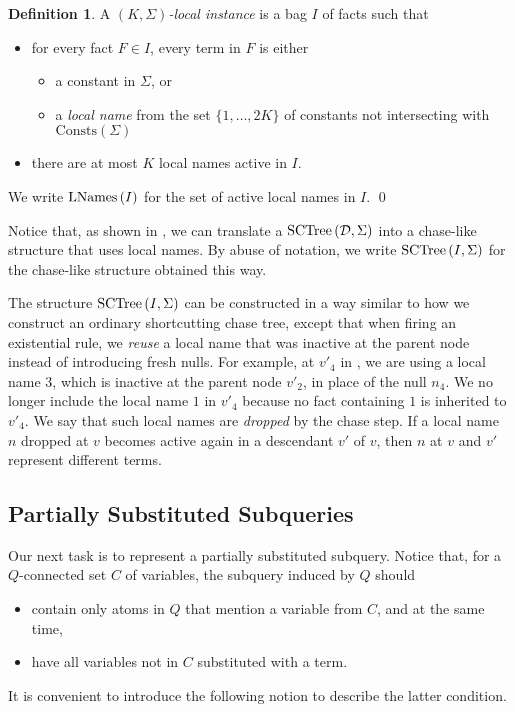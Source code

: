 \documentclass[12pt]{report}
\theoremstyle{plain}
\theoremstyle{definition}
\newtheorem{definition}[theorem]{Definition}
\def\Consts{{\mathrm{Consts}}}
\newcommand{\SCTree}[2]{\ensuremath{\normalfont{\textrm{SCTree}} \left( #1, #2 \right)}}
\newcommand{\LNames}[1]{\ensuremath{\normalfont{\textrm{LNames}} \left( #1 \right)}}
\begin{document}
\begin{definition}
  A \emph{$(K, \Sigma)$-local instance} is a bag $I$ of facts such that
  \begin{itemize}
    \item for every fact $F \in I$, every term in $F$ is either
    \begin{itemize}
      \item a constant in $\Sigma$, or
      \item a \emph{local name} from the set $\{ 1, \ldots, 2K \}$ of constants not intersecting with $\Consts(\Sigma)$
    \end{itemize}
    \item there are at most $K$ local names active in $I$.
  \end{itemize}

  We write $\LNames{I}$ for the set of active local names in $I$.
  \qed
\end{definition}

Notice that, as shown in , we can translate a $\SCTree{\mathcal{D}}{\Sigma}$ into a chase-like structure that uses local names. By abuse of notation, we write $\SCTree{I}{\Sigma}$ for the chase-like structure obtained this way.

The structure $\SCTree{I}{\Sigma}$ can be constructed in a way similar to how we construct an ordinary shortcutting chase tree, except that when firing an existential rule, we \emph{reuse} a local name that was inactive at the parent node instead of introducing fresh nulls. For example, at $v'_4$ in , we are using a local name $3$, which is inactive at the parent node $v'_2$, in place of the null $n_4$. We no longer include the local name $1$ in $v'_4$ because no fact containing $1$ is inherited to $v'_4$. We say that such local names are \emph{dropped} by the chase step. If a local name $n$ dropped at $v$ becomes active again in a descendant $v'$ of $v$, then $n$ at $v$ and $v'$ represent different terms.

\subsection{Partially Substituted Subqueries}
\label{subsection:partially-substituted-subqueries}

Our next task is to represent a partially substituted subquery. Notice that, for a $Q$-connected set $C$ of variables, the subquery induced by $Q$ should
\begin{itemize}
  \item contain only atoms in $Q$ that mention a variable from $C$, and at the same time,
  \item have all variables not in $C$ substituted with a term.
\end{itemize}
It is convenient to introduce the following notion to describe the latter condition.
\end{document}
